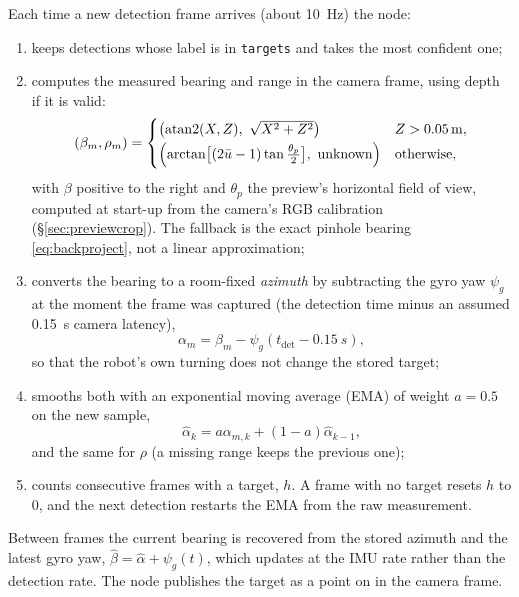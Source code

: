 Each time a new detection frame arrives (about \SI{10}{Hz}) the node:
\begin{enumerate}
\item keeps detections whose label is in \texttt{targets} and takes the most
  confident one;
\item computes the measured bearing and range in the camera frame, using
  depth if it is valid:
\begin{equation}\label{eq:chasemeas}
(\beta_m,\rho_m)=\begin{cases}
\bigl(\atantwo(X,Z),\ \sqrt{X^2+Z^2}\bigr) & Z>\SI{0.05}{m},\\[2pt]
\Bigl(\arctan\bigl[(2\bar u-1)\tan\tfrac{\theta_p}{2}\bigr],\ \text{unknown}\Bigr) & \text{otherwise},
\end{cases}
\end{equation}
  with $\beta$ positive to the right and $\theta_p$ the preview's horizontal
  field of view, computed at start-up from the camera's RGB calibration
  (\S\ref{sec:previewcrop}). The fallback is the exact pinhole bearing
  \eqref{eq:backproject}, not a linear approximation;
\item converts the bearing to a room-fixed \emph{azimuth} by subtracting the
  gyro yaw $\psi_g$ at the moment the frame was captured (the detection time
  minus an assumed \SI{0.15}{s} camera latency),
\begin{equation}\label{eq:azimuth}
\alpha_m=\beta_m-\psi_g(t_{\mathrm{det}}-\SI{0.15}{s}),
\end{equation}
  so that the robot's own turning does not change the stored target;
\item smooths both with an exponential moving average (EMA) of weight $a=0.5$
  on the new sample,
\begin{equation}\label{eq:ema}
\hat\alpha_k = a\alpha_{m,k}+(1-a)\hat\alpha_{k-1},
\end{equation}
  and the same for $\rho$ (a missing range keeps the previous one);
\item counts consecutive frames with a target, $h$. A frame with no target
  resets $h$ to 0, and the next detection restarts the EMA from the raw
  measurement.
\end{enumerate}
Between frames the current bearing is recovered from the stored azimuth and
the latest gyro yaw, $\hat\beta=\hat\alpha+\psi_g(t)$, which updates at the
IMU rate rather than the detection rate. The node publishes the target as a
point on  in the camera frame.

